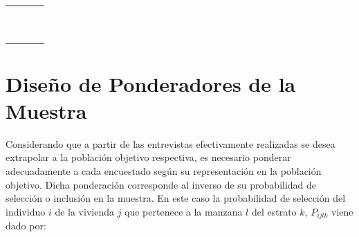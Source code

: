\documentclass[
]{book}
\begin{document}
\begin{table}
\begin{tabular}[t]{>{\raggedright\arraybackslash}p{3cm}>{\raggedright\arraybackslash}p{3cm}>{\raggedleft\arraybackslash}p{3cm}>{\raggedleft\arraybackslash}p{3cm}}
\hspace{1em}\cellcolor{white}{} & \cellcolor{white}{Providencia} & \cellcolor{white}{7} & \cellcolor{white}{3}\\
\hspace{1em}\cellcolor{white}{} & \cellcolor{white}{Pudahuel} & \cellcolor{white}{14} & \cellcolor{white}{2}\\
\hspace{1em}\cellcolor{white}{} & \cellcolor{white}{Puente Alto} & \cellcolor{white}{32} & \cellcolor{white}{2}\\
\hspace{1em}\cellcolor{white}{} & \cellcolor{white}{Quilicura} & \cellcolor{white}{12} & \cellcolor{white}{2}\\
\hspace{1em}\cellcolor{white}{} & \cellcolor{white}{San Bernardo} & \cellcolor{white}{16} & \cellcolor{white}{2}\\
\hspace{1em}\cellcolor{white}{} & \cellcolor{white}{San Joaquín} & \cellcolor{white}{6} & \cellcolor{white}{2}\\
\hspace{1em}\cellcolor{white}{} & \cellcolor{white}{San Miguel} & \cellcolor{white}{9} & \cellcolor{white}{3}\\
\hspace{1em}\cellcolor{white}{} & \cellcolor{white}{San Ramón} & \cellcolor{white}{6} & \cellcolor{white}{2}\\
\hspace{1em}\cellcolor{white}{} & \cellcolor{white}{Santiago} & \cellcolor{white}{120} & \cellcolor{white}{3}\\
\hspace{1em}\cellcolor{white}{} & \cellcolor{white}{Vitacura} & \cellcolor{white}{9} & \cellcolor{white}{3}\\
\bottomrule
\end{tabular}
\end{table}

\hypertarget{diseuxf1o-de-ponderadores-de-la-muestra}{%
\section{Diseño de Ponderadores de la Muestra}\label{diseuxf1o-de-ponderadores-de-la-muestra}}

Considerando que a partir de las entrevistas efectivamente realizadas se desea extrapolar a la población objetivo respectiva, es necesario ponderar adecuadamente a cada encuestado según su representación en la población objetivo. Dicha ponderación corresponde al inverso de su probabilidad de selección o inclusión en la muestra. En este caso la probabilidad de selección del individuo \(i\) de la vivienda \(j\) que pertenece a la manzana \(l\) del estrato \(k\), \(P_{ijlk}\) viene dado por:
\end{document}
